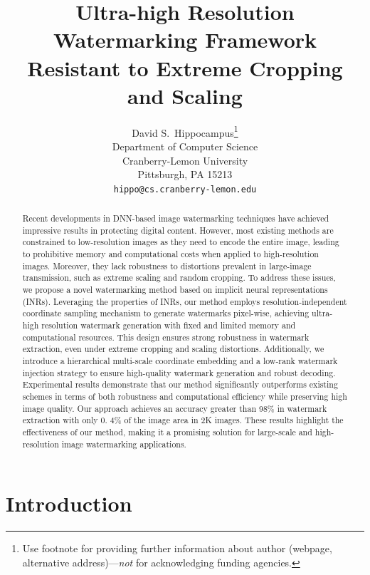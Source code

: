 \documentclass{article}
\title{Ultra-high Resolution Watermarking Framework Resistant to Extreme Cropping and Scaling}
\author{%
  David S.~Hippocampus\thanks{Use footnote for providing further information
    about author (webpage, alternative address)---\emph{not} for acknowledging
    funding agencies.} \\
  Department of Computer Science\\
  Cranberry-Lemon University\\
  Pittsburgh, PA 15213 \\
  \texttt{hippo@cs.cranberry-lemon.edu} \\
}
\begin{document}
\maketitle


\begin{abstract}
Recent developments in DNN-based image watermarking techniques have achieved impressive results in protecting digital content. 
However, most existing methods are constrained to low-resolution images as they need to encode the entire image, leading to prohibitive memory and computational costs when applied to high-resolution images. 
Moreover, they lack robustness to distortions prevalent in large-image transmission, such as extreme scaling and random cropping.
To address these issues, we propose a novel watermarking method based on implicit neural representations (INRs). 
Leveraging the properties of INRs, our method employs resolution-independent coordinate sampling mechanism to generate watermarks pixel-wise, achieving ultra-high resolution watermark generation with fixed and limited memory and computational resources. This design ensures strong robustness in watermark extraction, even under extreme cropping and scaling distortions.
Additionally, we introduce a hierarchical multi-scale coordinate embedding and a low-rank watermark injection strategy to ensure high-quality watermark generation and robust decoding.
Experimental results demonstrate that our method significantly outperforms existing schemes in terms of both robustness and computational efficiency while preserving high image quality.
Our approach achieves an accuracy greater than 98\% in watermark extraction with only 0. 4\% of the image area in 2K images. These results highlight the effectiveness of our method, making it a promising solution for large-scale and high-resolution image watermarking applications.

\end{abstract}


\section{Introduction} \label{introduction}




\end{document}
